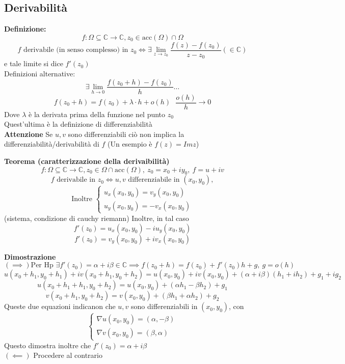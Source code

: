 \documentclass[a4paper]{article}
\newcommand{\C}{\mathbb{C}}
\begin{document}
\subsection{Derivabilità}
\textbf{Definizione: }
\[f:\Omega \subseteq \C\to \C, z_0\in \text{acc}(\Omega)\cap \Omega\]
\[f \text{ derivabile (in senso complesso) in } z_0 \iff\exists \lim_{z \to z_0} \frac{f(z)-f(z_0)}{z-z_0}(\in\C)\]
e tale limite si dice $f'(z_0)$ 
\\Definizioni alternative:
\[\exists \lim_{h \to 0} \frac{f(z_0+h)-f(z_0)}{h}\ldots\]
\[f(z_0+h)=f(z_0)+\lambda\cdot h + o(h)\ \ \ \frac{o(h)}{h}\to 0\]
Dove $\lambda$ è la derivata prima della funzione nel punto $z_0$
\\Quest'ultima è la definizione di differenziabilità
\\\textbf{Attenzione} Se $u,v$ sono differenziabili ciò non implica la differenziabilità/derivabilità di $f$ (Un esempio è $f(z)=Imz$)
\begin{tcolorbox}
\textbf{Teorema (caratterizzazione della derivaibilità)}
\[f:\Omega \subseteq \C\to \C, z_0\in \Omega \cap \text{acc}(\Omega),\ z_0=x_0+iy_0,\ f=u+iv\]
\[f \text{ derivabile in }z_0\iff u,v \text{ differenziabile in } (x_0,y_0),\]
\[\text{Inoltre } \begin{cases}	
u_x(x_0,y_0)=v_y(x_0,y_0)
\\u_y(x_0,y_0)=-v_x(x_0,y_0)
\end{cases}
\]
(sistema, condizione di cauchy riemann)
Inoltre, in tal caso 
\[f'(z_0)=u_x(x_0,y_0)-iu_y(x_0,y_0)\]
\[f'(z_0)=v_y(x_0,y_0)+iv_x(x_0,y_0)\]

\end{tcolorbox}
\textbf{Dimostrazione}
\[(\implies) \text{Per Hp } \exists f'(z_0)=\alpha +i\beta\in\C\implies f(z_0+h)=f(z_0)+f'(z_0)h+g,\ g=o(h)\]
\[
	u(x_0+h_1,y_0+h_1)+iv(x_0+h_1,y_0+h_2)=u(x_0,y_0)+iv(x_0,y_0)+(\alpha+i\beta)(h_1+ih_2)+g_1+ig_2
\]
\[u(x_0+h_1+h_1,y_0+h_2)=u(x_0,y_0)+(\alpha h_1-\beta h_2)+g_1\]
\[v(x_0+h_1,y_0+h_2)=v(x_0,y_0)+(\beta h_1+\alpha h_2)+g_2\]
Queste due equazioni indicanon che $u,v$ sono differenziabili in $(x_0,y_0)$, con 
\[
	\begin{cases}
\nabla u(x_0,y_0)=(\alpha, -\beta)\\ 
\nabla v(x_0,y_0)=(\beta, \alpha)
	\end{cases}
\]
Questo dimostra inoltre che $f'(z_0)=\alpha+i\beta$
\\$(\impliedby)$ Procedere al contrario
\end{document}

